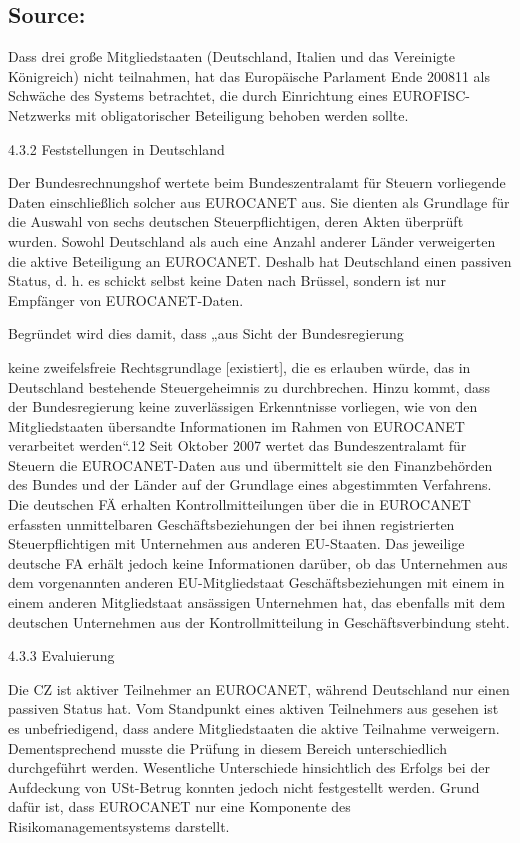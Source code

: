 \documentclass[10pt]{article}
\begin{document}
\subsection*{Source:}

Dass drei große Mitgliedstaaten (Deutschland, Italien und das Vereinigte Königreich) nicht teilnahmen, hat das Europäische Parlament Ende 200811 als Schwäche des Systems betrachtet, die durch Einrichtung eines EUROFISC-Netzwerks mit obligatorischer Beteiligung behoben werden sollte.


4.3.2 Feststellungen in Deutschland

Der Bundesrechnungshof wertete beim Bundeszentralamt für Steuern vorliegende Daten einschließlich solcher aus EUROCANET aus.
Sie dienten als Grundlage für die Auswahl von sechs deutschen Steuerpflichtigen, deren Akten überprüft wurden.
Sowohl Deutschland als auch eine Anzahl anderer Länder verweigerten die aktive Beteiligung an EUROCANET.
Deshalb hat Deutschland einen passiven Status, d. h. es schickt selbst keine Daten nach Brüssel, sondern ist nur Empfänger von EUROCANET-Daten.


Begründet wird dies damit, dass „aus Sicht der Bundesregierung

keine zweifelsfreie Rechtsgrundlage [existiert], die es erlauben würde, das in Deutschland bestehende Steuergeheimnis zu durchbrechen.
Hinzu kommt, dass der Bundesregierung keine zuverlässigen Erkenntnisse vorliegen, wie von den Mitgliedstaaten übersandte Informationen im Rahmen von EUROCANET verarbeitet werden“.12 Seit Oktober 2007 wertet das Bundeszentralamt für Steuern die EUROCANET-Daten aus und übermittelt sie den Finanzbehörden des Bundes und der Länder auf der Grundlage eines abgestimmten Verfahrens.
Die deutschen FÄ erhalten Kontrollmitteilungen über die in EUROCANET erfassten unmittelbaren Geschäftsbeziehungen der bei ihnen registrierten Steuerpflichtigen mit Unternehmen aus anderen EU-Staaten.
Das jeweilige deutsche FA erhält jedoch keine Informationen darüber, ob das Unternehmen aus dem vorgenannten anderen EU-Mitgliedstaat Geschäftsbeziehungen mit einem in einem anderen Mitgliedstaat ansässigen Unternehmen hat, das ebenfalls mit dem deutschen Unternehmen aus der Kontrollmitteilung in Geschäftsverbindung steht.


4.3.3 Evaluierung

Die CZ ist aktiver Teilnehmer an EUROCANET, während Deutschland nur einen passiven Status hat.
Vom Standpunkt eines aktiven Teilnehmers aus gesehen ist es unbefriedigend, dass andere Mitgliedstaaten die aktive Teilnahme verweigern.
Dementsprechend musste die Prüfung in diesem Bereich unterschiedlich durchgeführt werden.
Wesentliche Unterschiede hinsichtlich des Erfolgs bei der Aufdeckung von USt-Betrug konnten jedoch nicht festgestellt werden. Grund dafür ist, dass EUROCANET nur eine Komponente des Risikomanagementsystems darstellt.
\end{document}
